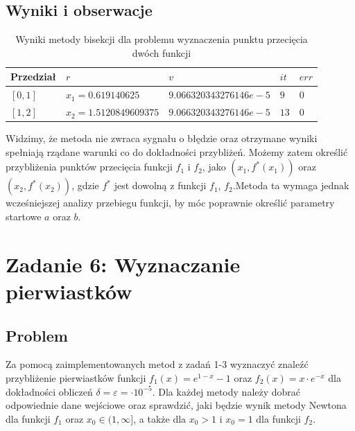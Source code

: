 \documentclass[11pt]{article}
\begin{document}
    \subsection*{Wyniki i obserwacje}
        \begin{table}[h!]
        \centering
        \begin{tabularx}{0.7\textwidth}{l l l l l }
            \hline
            Przedział & $r$ & $v$ & $it$ & $err$ \\
            \hline
            $[0, 1]$ & $x_1 = 0.619140625$ & $9.066320343276146e-5$ & $9$ & $0$ \\
            $[1, 2]$ & $x_2 = 1.5120849609375$ & $9.066320343276146e-5$ & $13$ & $0$ \\
            \hline
        \end{tabularx}
        \label{table:ex5}
        \caption{Wyniki metody bisekcji dla problemu wyznaczenia punktu przecięcia dwóch funkcji}
        \end{table}

        \noindent Widzimy, że metoda nie zwraca sygnału o błędzie oraz otrzymane wyniki spełniają rządane warunki co do
        dokładności przybliżeń. Możemy zatem określić przybliżenia punktów przecięcia funkcji $f_1$ i $f_2$, jako
        $(x_1, f^*(x_1))$ oraz $(x_2, f^*(x_2))$, gdzie $f^*$ jest dowolną z funkcji $f_1$, $f_2$.Metoda ta wymaga jednak
        wcześniejszej analizy przebiegu funkcji, by móc poprawnie określić parametry startowe $a$ oraz $b$.

        \noindent\newline

\section*{Zadanie 6: Wyznaczanie pierwiastków}
    \subsection*{Problem}
        Za pomocą zaimplementowanych metod z zadań 1-3 wyznaczyć znaleźć przybliżenie pierwiastków
        funkcji $f_1(x) = e^{1 - x} - 1$ oraz $f_2(x) = x \cdot e^{-x}$ dla dokładności obliczeń 
        $\delta = \varepsilon = \cdot 10^{-5}$.
        \newline
        Dla każdej metody należy dobrać odpowiednie dane wejściowe oraz sprawdzić, jaki będzie wynik metody
        Newtona dla funkcji $f_1$ oraz $x_0 \in (1, \infty]$, a także dla $x_0 > 1$ i $x_0 = 1$ dla funkcji $f_2$.
        \newline
\end{document}
